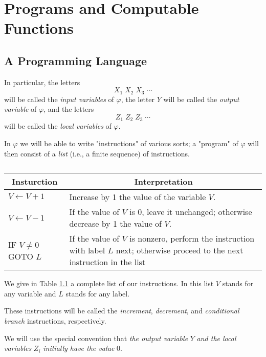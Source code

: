 \documentclass[a4paper,10pt,twoside]{book}
\begin{document}
\chapter{Programs and Computable Functions}
\section{A Programming Language}

In particular, the letters $$X_1\;X_2\;X_3\;\cdots$$ will be called the \textit{input variables} of $\varphi$, the letter $Y$ will be called the \textit{output variable} of $\varphi$, and the letters $$Z_1\;Z_2\;Z_3\;\cdots$$ will be called the \textit{local variables} of $\varphi$.

In $\varphi$ we will be able to write "instructions" of various sorts; a "program" of $\varphi$ will then consist of a \textit{list} (i.e., a finite sequence) of instructions.

\begin{table}[htbp]
    \caption{}
    \begin{tabular}{p{}p{}}
        \toprule
        \multicolumn{1}{c}{Insturction} & \multicolumn{1}{c}{Interpretation}                                                                                       \\
        \midrule
        $V\leftarrow V+1$     & Increase by 1 the value of the variable $V$.                                                                                       \\
        $V\leftarrow V-1$     & If the value of $V$ is 0, leave it unchanged; otherwise decrease by 1 the value of $V$.                                            \\
        IF $V\neq 0$ GOTO $L$ & If the value of $V$ is nonzero, perform the instruction with label $L$ next; otherwise proceed to the next instruction in the list \\
        \bottomrule
    \end{tabular}
    \label{table:1.1}
\end{table}

We give in Table \ref{table:1.1} a complete list of our instructions. In this list $V$ stands for any variable and $L$ stands for any label.

These instructions will be called the \textit{increment}, \textit{decrement}, and \textit{conditional branch} instructions, respectively.

We will use the special convention that \textit{the output variable} $Y$ \textit{and the local variables} $Z_i$ \textit{initially have the value} 0.
\end{document}
